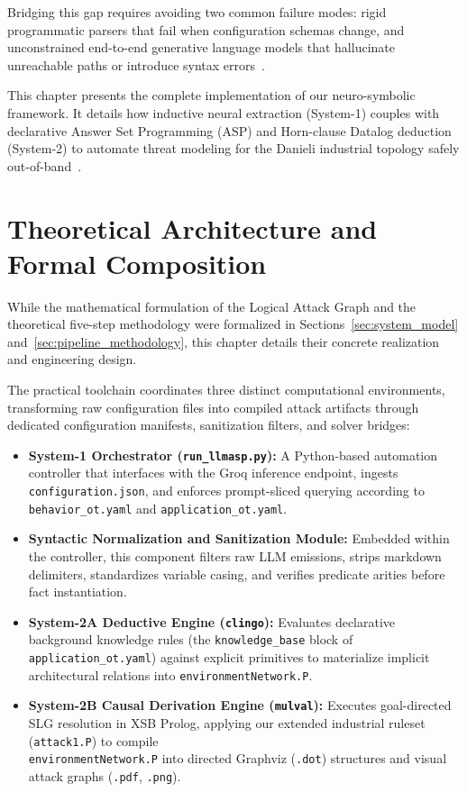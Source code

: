 \documentclass[target=mst,aauheader=aics,style=]{thud}
\begin{document}
Bridging this gap requires avoiding two common failure modes: rigid programmatic parsers that fail when configuration schemas change, and unconstrained end-to-end generative language models that hallucinate unreachable paths or introduce syntax errors~\cite{alviano2025llmasp, TayouriMIRAGE}. 

This chapter presents the complete implementation of our neuro-symbolic framework. It details how inductive neural extraction (System-1) couples with declarative Answer Set Programming (ASP) and Horn-clause Datalog deduction (System-2) to automate threat modeling for the Danieli industrial topology safely out-of-band~\cite{alviano2025llmasp}.

\section{Theoretical Architecture and Formal Composition}
\label{sec:architecture_theory}

While the mathematical formulation of the Logical Attack Graph and the theoretical five-step methodology were formalized in Sections~\ref{sec:system_model} and~\ref{sec:pipeline_methodology}, this chapter details their concrete realization and engineering design. 

The practical toolchain coordinates three distinct computational environments, transforming raw configuration files into compiled attack artifacts through dedicated configuration manifests, sanitization filters, and solver bridges:

\begin{itemize}
    \item \textbf{System-1 Orchestrator (\texttt{run\_llmasp.py}):} A Python-based automation controller that interfaces with the Groq inference endpoint, ingests \texttt{configuration.json}, and enforces prompt-sliced querying according to \texttt{behavior\_ot.yaml} and \texttt{application\_ot.yaml}.
    \item \textbf{Syntactic Normalization and Sanitization Module:} Embedded within the controller, this component filters raw LLM emissions, strips markdown delimiters, standardizes variable casing, and verifies predicate arities before fact instantiation.
    \item \textbf{System-2A Deductive Engine (\texttt{clingo}):} Evaluates declarative background knowledge rules (the \texttt{knowledge\_base} block of \texttt{application\_ot.yaml}) against explicit primitives to materialize implicit architectural relations into \texttt{environmentNetwork.P}.
    \item \textbf{System-2B Causal Derivation Engine (\texttt{mulval}):} Executes goal-directed SLG resolution in XSB Prolog, applying our extended industrial ruleset (\texttt{attack1.P}) to compile \\\texttt{environmentNetwork.P} into directed Graphviz (\texttt{.dot}) structures and visual attack graphs (\texttt{.pdf}, \texttt{.png}).
\end{itemize}
\end{document}
